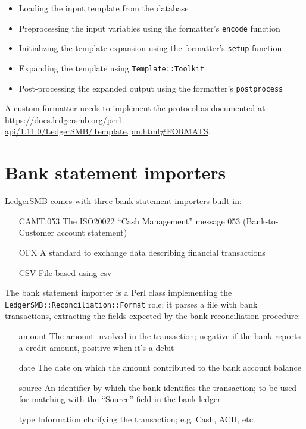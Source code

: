 \begin{itemize}
	\item Loading the input template from the database
	\item Preprocessing the input variables using the formatter's \texttt{encode}
		function
	\item Initializing the template expansion using the formatter's \texttt{setup} function
	\item Expanding the template using \texttt{Template::Toolkit}
	\item Post-processing the expanded output using the formatter's \texttt{postprocess}
\end{itemize}

A custom formatter needs to implement the protocol as documented at \url{https://docs.ledgersmb.org/perl-api/1.11.0/LedgerSMB/Template.pm.html#FORMATS}.

\section{Bank statement importers}
\label{sec-customization-bank-importers}

LedgerSMB comes with three bank statement importers built-in:

\begin{itemize}
	\item [CAMT.053] The \gls{ISO20022} ``Cash Management'' message 053
		(Bank-to-Customer account statement)
	\item [\gls{OFX}\index{OFX}] A standard to exchange data describing financial transactions
	\item [CSV]  File based using \gls{csv}
\end{itemize}

The bank statement importer is a Perl class implementing the
\texttt{LedgerSMB::Reconciliation::Format} role; it parses a file with bank
transactions, extracting the fields expected by the bank reconciliation procedure:

\begin{itemize}
	\item [amount] The amount involved in the transaction; negative if the bank
		reports a credit amount, positive when it's a debit
	\item [date] The date on which the amount contributed to the bank account balance
	\item [source] An identifier by which the bank identifies the transaction; to be
		used for matching with the ``Source'' field in the bank ledger
	\item [type] Information clarifying the transaction; e.g. Cash, ACH, etc.
\end{itemize}

